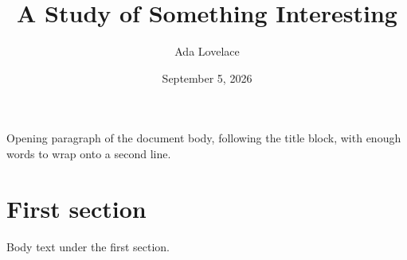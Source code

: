 \documentclass[a4paper,10pt]{article}
\title{A Study of Something Interesting}
\author{Ada Lovelace}
\date{September 5, 2026}
\begin{document}
\maketitle

Opening paragraph of the document body, following the title block, with enough
words to wrap onto a second line.

\section{First section}

Body text under the first section.
\end{document}
